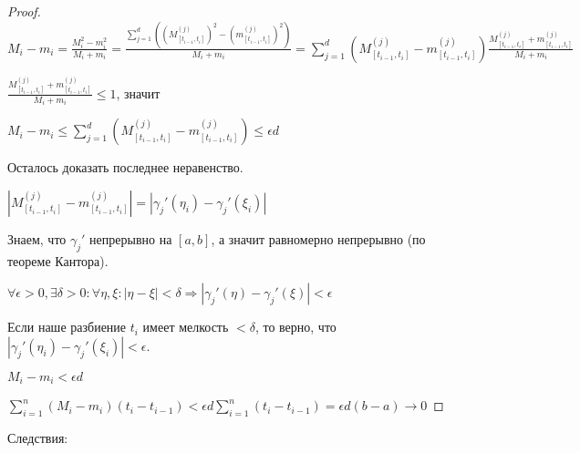 \begin{proof}
        $M_i - m_i = \frac{M_i^2 - m_i^2}{M_i + m_i} = 
        \frac{\sum\limits_{j = 1}^d ((M_{[t_{i - 1}, t_{i}]}^{(j)})^2 - (m_{[t_{i - 1}, t_{i}]}^{(j)})^2)}{M_i + m_i} = 
        \sum\limits_{j = 1}^d (M_{[t_{i - 1}, t_{i}]}^{(j)} - m_{[t_{i - 1}, t_{i}]}^{(j)}) 
        \frac{M_{[t_{i - 1}, t_{i}]}^{(j)} + m_{[t_{i - 1}, t_{i}]}^{(j)}}{M_i + m_i}$

        $\frac{M_{[t_{i - 1}, t_{i}]}^{(j)} + m_{[t_{i - 1}, t_{i}]}^{(j)}}{M_i + m_i} \le 1$, значит

        $M_i - m_i \le \sum\limits_{j = 1}^d (M_{[t_{i - 1}, t_{i}]}^{(j)} - m_{[t_{i - 1}, t_{i}]}^{(j)}) \le \epsilon d$

        Осталось доказать последнее неравенство.

        $|M_{[t_{i - 1}, t_{i}]}^{(j)} - m_{[t_{i - 1}, t_{i}]}^{(j)}| = |\gamma_j'(\eta_i) - \gamma_j'(\xi_i)|$

        Знаем, что $\gamma_j'$ непрерывно на $[a, b]$, а значит равномерно непрерывно (по теореме Кантора).

        $\forall \epsilon > 0, \exists \delta > 0: \forall \eta, \xi \colon |\eta - \xi| < \delta \Rightarrow |\gamma_j'(\eta) - \gamma_j'(\xi)| < \epsilon$

        Если наше разбиение ${t_i}$ имеет мелкость $< \delta$, то верно, что $|\gamma_j'(\eta_i) - \gamma_j'(\xi_i)| < \epsilon$.

        $M_i - m_i < \epsilon d$

        $\sum\limits_{i = 1}^n (M_i - m_i)(t_i - t_{i - 1}) < \epsilon d \sum\limits_{i = 1}^n (t_i - t_{i - 1}) = \epsilon d (b - a) \rightarrow 0$

    \end{proof}

    Следствия:

